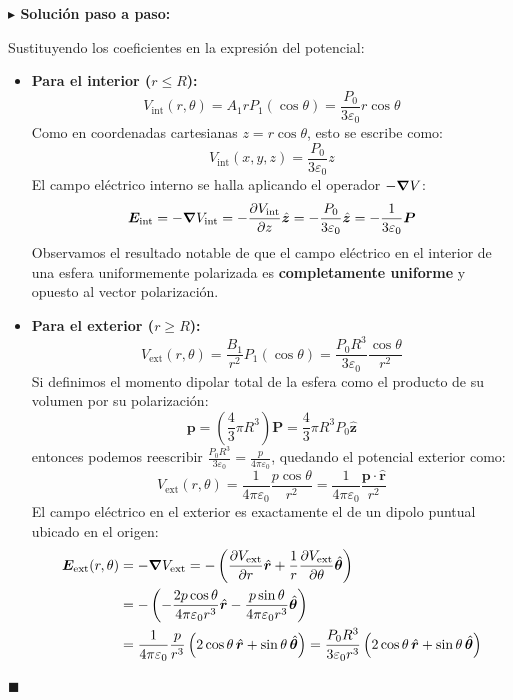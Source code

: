 \documentclass[11pt,a4paper]{book}
\newenvironment{solucion}{%
    \par\medskip\noindent\textbf{\color{blue!65!black}\Large $\blacktriangleright$ Solución paso a paso:}\par\medskip
}{%
    \hfill$\blacksquare$\par\bigskip
}
\newcommand{\rhat}{\hat{\bm{r}}}
\newcommand{\thetahat}{\hat{\bm{\theta}}}
\newcommand{\zhat}{\hat{\bm{z}}}
\newcommand{\Evec}{\bm{E}}
\newcommand{\Pvec}{\bm{P}}
\begin{document}
\begin{solucion}
Sustituyendo los coeficientes en la expresión del potencial:
\begin{itemize}
    \item \textbf{Para el interior ($r \le R$):}
    \begin{equation}
        V_{\text{int}}(r,\theta) = A_1 r P_1(\cos\theta) = \frac{P_0}{3\varepsilon_0} r \cos\theta
    \end{equation}
    Como en coordenadas cartesianas $z = r \cos\theta$, esto se escribe como:
    \begin{equation}
        V_{\text{int}}(x,y,z) = \frac{P_0}{3\varepsilon_0} z
    \end{equation}
    El campo eléctrico interno se halla aplicando el operador $-\grad V$:
    \begin{equation}
        \Evec_{\text{int}} = -\grad V_{\text{int}} = -\pdv{V_{\text{int}}}{z}\zhat = -\frac{P_0}{3\varepsilon_0}\zhat = -\frac{1}{3\varepsilon_0}\Pvec
    \end{equation}
    Observamos el resultado notable de que el campo eléctrico en el interior de una esfera uniformemente polarizada es \textbf{completamente uniforme} y opuesto al vector polarización.

    \item \textbf{Para el exterior ($r \ge R$):}
    \begin{equation}
        V_{\text{ext}}(r,\theta) = \frac{B_1}{r^2} P_1(\cos\theta) = \frac{P_0 R^3}{3\varepsilon_0} \frac{\cos\theta}{r^2}
    \end{equation}
    Si definimos el momento dipolar total de la esfera como el producto de su volumen por su polarización:
    \begin{equation}
        \bm{p} = \left(\frac{4}{3}\pi R^3\right) \Pvec = \frac{4}{3}\pi R^3 P_0 \zhat
    \end{equation}
    entonces podemos reescribir $\frac{P_0 R^3}{3\varepsilon_0} = \frac{p}{4\pi\varepsilon_0}$, quedando el potencial exterior como:
    \begin{equation}
        V_{\text{ext}}(r,\theta) = \frac{1}{4\pi\varepsilon_0}\frac{p \cos\theta}{r^2} = \frac{1}{4\pi\varepsilon_0}\frac{\bm{p}\cdot\rhat}{r^2}
    \end{equation}
    El campo eléctrico en el exterior es exactamente el de un dipolo puntual ubicado en el origen:
    \begin{align}
        \Evec_{\text{ext}}(r,\theta) &= -\grad V_{\text{ext}} = -\left( \pdv{V_{\text{ext}}}{r}\rhat + \frac{1}{r}\pdv{V_{\text{ext}}}{\theta}\thetahat \right) \nonumber \\
        &= -\left( -\frac{2p\cos\theta}{4\pi\varepsilon_0 r^3}\rhat - \frac{p\sin\theta}{4\pi\varepsilon_0 r^3}\thetahat \right) \nonumber \\
        &= \frac{1}{4\pi\varepsilon_0}\frac{p}{r^3}\left(2\cos\theta\,\rhat + \sin\theta\,\thetahat\right) = \frac{P_0 R^3}{3\varepsilon_0 r^3}\left(2\cos\theta\,\rhat + \sin\theta\,\thetahat\right)
    \end{align}
\end{itemize}
\end{solucion}
\end{document}
